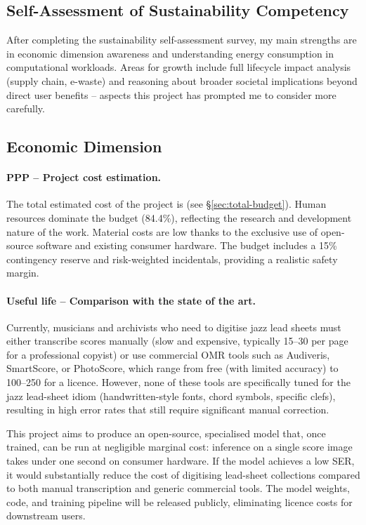 \documentclass[11pt, a4paper]{article}
\begin{document}
\subsection{Self-Assessment of Sustainability Competency}
\label{sec:self-assessment}

After completing the sustainability self-assessment survey, my main strengths are in economic dimension awareness and understanding energy consumption in computational workloads. Areas for growth include full lifecycle impact analysis (supply chain, e-waste) and reasoning about broader societal implications beyond direct user benefits -- aspects this project has prompted me to consider more carefully.

\subsection{Economic Dimension}
\label{sec:econ-sustainability}

\paragraph{PPP -- Project cost estimation.}
The total estimated cost of the project is  (see \S\ref{sec:total-budget}). Human resources dominate the budget (84.4\%), reflecting the research and development nature of the work. Material costs are low thanks to the exclusive use of open-source software and existing consumer hardware. The budget includes a 15\% contingency reserve and risk-weighted incidentals, providing a realistic safety margin.

\paragraph{Useful life -- Comparison with the state of the art.}
Currently, musicians and archivists who need to digitise jazz lead sheets must either transcribe scores manually (slow and expensive, typically \EUR{}15--30 per page for a professional copyist) or use commercial OMR tools such as Audiveris, SmartScore, or PhotoScore, which range from free (with limited accuracy) to \EUR{}100--250 for a licence. However, none of these tools are specifically tuned for the jazz lead-sheet idiom (handwritten-style fonts, chord symbols, specific clefs), resulting in high error rates that still require significant manual correction.

This project aims to produce an open-source, specialised model that, once trained, can be run at negligible marginal cost: inference on a single score image takes under one second on consumer hardware. If the model achieves a low SER, it would substantially reduce the cost of digitising lead-sheet collections compared to both manual transcription and generic commercial tools. The model weights, code, and training pipeline will be released publicly, eliminating licence costs for downstream users.
\end{document}
